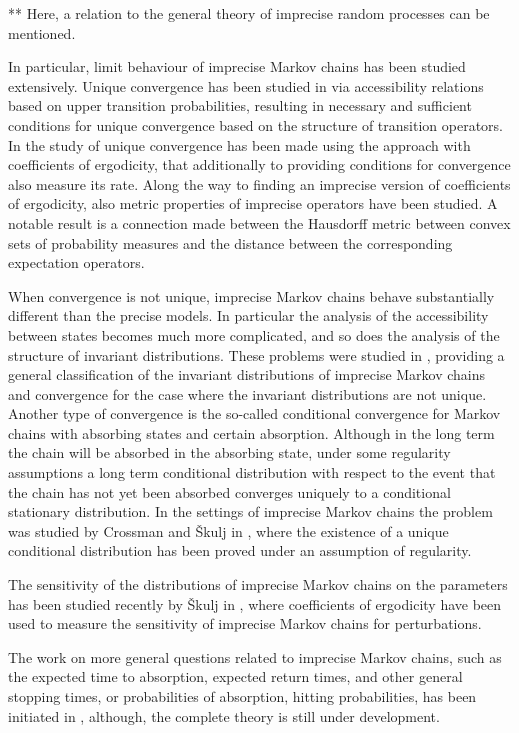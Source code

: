 \documentclass[11pt,dvipsnames,usenames,a4paper]{article}
\begin{document}
** Here, a relation to the general theory of imprecise random processes can be mentioned. 

In particular, limit behaviour of imprecise Markov chains has been studied extensively. Unique convergence has been studied in \cite{cooman2008} via accessibility relations based on upper transition probabilities, resulting in necessary and sufficient conditions for unique convergence based on the structure of transition operators. In \cite{skulj:13a} the study of unique convergence has been made using the approach with coefficients of ergodicity, that additionally to providing conditions for convergence also measure its rate. Along the way to finding an imprecise version of coefficients of ergodicity, also metric properties of imprecise operators have been studied. A notable result is a connection made between the Hausdorff metric between convex sets of probability measures and the distance between the corresponding expectation operators. 

When convergence is not unique, imprecise Markov chains behave substantially different than the precise models. In particular the analysis of the accessibility between states becomes much more complicated, and so does the analysis of the structure of invariant distributions. These problems were studied in \cite{skulj:13b}, providing a general classification of the invariant distributions of imprecise Markov chains and convergence for the case where the invariant distributions are not unique. Another type of convergence is the so-called conditional convergence for Markov chains with absorbing states and certain absorption. Although in the long term the chain will be absorbed in the absorbing state, under some regularity assumptions a long term conditional distribution with respect to the event that the chain has not yet been absorbed converges uniquely to a conditional stationary distribution. In the settings of imprecise Markov chains the problem was studied by Crossman and Škulj in \cite{crossman-2009}, where the existence of a unique conditional distribution has been proved under an assumption of regularity. 

The sensitivity of the distributions of imprecise Markov chains on the parameters has been studied recently by Škulj in \cite{skulj:16b}, where coefficients of ergodicity have been used to measure the sensitivity of imprecise Markov chains for perturbations. 

The work on more general questions related to imprecise Markov chains, such as the expected time to absorption, expected return times, and other general stopping times, or probabilities of absorption, hitting probabilities, has been initiated in \cite{isipta13withmatthias, relation to general random processes}, although, the complete theory is still under development. 
\end{document}
